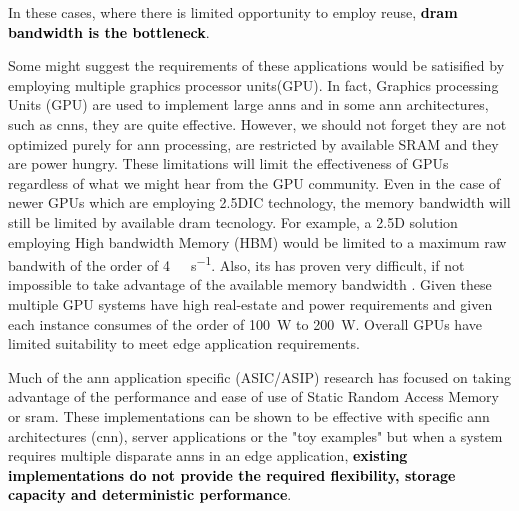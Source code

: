 In these cases, where there is limited opportunity to employ reuse, \textbf{\textcolor{black}{\ac{dram} bandwidth is the bottleneck}}.




\iffalse
So considering the performance improvements observed in other applications, it is expected that many customer facing or edge applications will implement multiple instances of artificial neural networks to perform various functions.
have very large memory and processing requirements.
require multiple instances of \ac{ann}s of similar size to the \ac{ann} described in \cite{krizhevsky2012imagenet}.

For example employing multiple cameras or monitoring and controlling different systems in a drone, a automobile each with an image recognition \ac{ann}\cite{krizhevsky2012imagenet}\cite{bojarski2016end} for navigation, engine monitoring along with other system control.
\fi

Some might suggest the requirements of these applications would be satisified by employing multiple graphics processor units(GPU).
In fact, Graphics processing Units (GPU) are used to implement large \ac{ann}s and in some \ac{ann} architectures, such as \acp{cnn}, they are quite effective. However, we should not forget they are not optimized purely for \ac{ann} processing, are restricted by available SRAM and they are power hungry. These limitations will limit the effectiveness of GPUs regardless of what we might hear from the GPU community.
Even in the case of newer GPUs which are employing 2.5DIC technology, the memory bandwidth will still be limited by available \ac{dram} tecnology.
For example, a 2.5D solution employing High bandwidth Memory (HBM) would be limited to a maximum raw bandwith of the order of \SI[per-mode=symbol]{4}{\tera \bit \per \second}.
Also, its has proven very difficult, if not impossible to take advantage of the available memory bandwidth \cite{farabet2011neuflow} \cite{tensorflow2015-whitepaper}.
Given these multiple GPU systems have high real-estate and power requirements and given each instance consumes of the order of \SI{100}{\watt} to \SI{200}{\watt}.
Overall GPUs have limited suitability to meet edge application requirements.


Much of the \ac{ann} application specific (ASIC/ASIP) research has focused on taking advantage of the performance and ease of use of Static Random Access Memory or \ac{sram}. 
These implementations can be shown to be effective with specific \ac{ann} architectures (\ac{cnn}), server applications or the "toy examples" but when a system requires multiple disparate \ac{ann}s in an edge application, \textbf{\textcolor{black}{existing implementations do not provide the required flexibility, storage capacity and deterministic performance}}.

